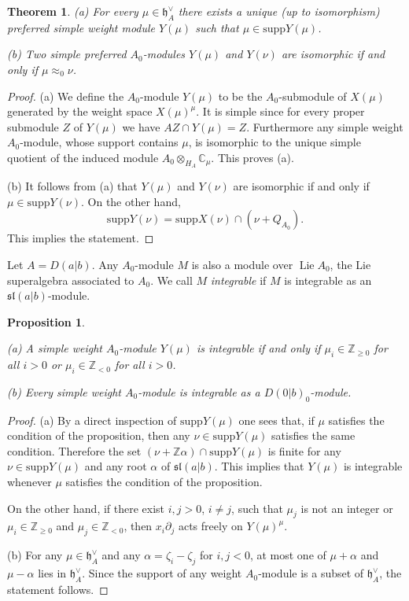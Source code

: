 \documentclass[12pt]{amsart}
\theoremstyle{plain} %
\numberwithin{equation}{section}
\theoremstyle{definition}
\theoremstyle{remark}
\theoremstyle{plain} %
\newtheorem{theorem}[definition]{Theorem}
\newtheorem{proposition}[definition]{Proposition}
\newcommand{\supp}{\mathrm{supp}}
\newcommand{\gh}{\mathfrak{h}}
\def\gh{\mathfrak{h}}
\begin{document}
    \begin{theorem}\label{Zero}
      (a) For every $\mu\in \gh_A^\vee$ there exists a unique (up to isomorphism) preferred simple weight module $Y(\mu)$ such that $\mu\in\supp Y(\mu)$.

      (b) Two simple preferred $A_0$-modules $Y(\mu)$ and $Y(\nu)$ are isomorphic if and only if  $\mu\approx_{0}\nu$.
      \end{theorem}
      \begin{proof} (a) We define the $A_0$-module $Y(\mu)$ to be the $A_0$-submodule of $X(\mu)$ generated by the weight space $X(\mu)^\mu$. It is simple
        since  for every proper submodule $Z$ of $Y(\mu)$ we have $AZ\cap Y(\mu)=Z$. Furthermore any simple weight $A_0$-module, whose 
        support contains $\mu$, is isomorphic to the unique simple quotient of the induced module $A_0\otimes_{H_A}\mathbb C_\mu$. This proves (a).
        
        (b) It follows from (a) that $Y(\mu)$ and $Y(\nu)$ are isomorphic if and only if $\mu\in\supp Y(\nu)$. On the other hand,
        $$\supp Y(\nu)=\supp X(\nu)\cap (\nu+Q_{A_0}).$$
      This implies the statement.
        \end{proof}
    Let $A=D(a|b)$. Any $A_0$-module $M$ is also a module over $\operatorname{Lie}A_0$, the Lie superalgebra associated to $A_0$.  We call $M$
    {\it integrable} if $M$ is integrable as an $\mathfrak{sl}(a|b)$-module.
    \begin{proposition}\label{integrable}

      (a) A simple  weight $A_0$-module $Y(\mu)$ is integrable if and only if $\mu_i\in\mathbb Z_{\geq 0}$
      for all $i>0$ or $\mu_i\in\mathbb Z_{<0}$ for all $i>0$.

      (b) Every simple weight $A_0$-module is integrable as a  $D(0|b)_0$-module.
    \end{proposition}
    \begin{proof} (a) By a direct inspection of $\supp Y(\mu)$ one sees that, if $\mu$ satisfies the condition of the proposition, then any
      $\nu\in\supp Y(\mu)$
      satisfies the same
      condition. Therefore the set $(\nu+\mathbb Z\alpha)\cap\supp Y(\mu)$ is finite for any    $\nu\in\supp Y(\mu)$ and any root $\alpha$ of
      $\mathfrak{sl}(a|b)$.
    This implies that $Y(\mu)$ is integrable whenever $\mu$ satisfies the condition of the proposition.

      On the other hand, if there exist $i,j>0$, $i\neq j$, such that $\mu_j$ is not an integer or
      $\mu_i\in\mathbb Z_{\geq 0}$ and $\mu_j\in\mathbb Z_{<0}$, then $x_i\partial_j$ acts freely on $Y(\mu)^\mu$.

      (b) For any $\mu\in\gh^\vee_A$ and any $\alpha=\zeta_i-\zeta_j$ for $i,j<0$, at most one of $\mu+\alpha$ and $\mu-\alpha$ lies in $\gh^\vee_A$.
      Since the support of any weight $A_0$-module is a subset of  $\gh^\vee_A$, the statement follows.
      \end{proof}
\end{document}
